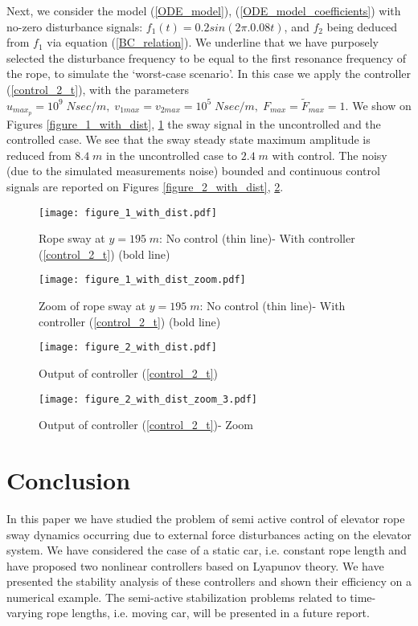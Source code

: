 \documentclass[letterpaper, 11 pt, conference]{ieeeconf}
\begin{document}
Next, we consider the model (\ref{ODE_model}),
(\ref{ODE_model_coefficients}) with no-zero disturbance signals:
$f_{1}(t)=0.2 sin(2\pi.0.08t)$, and $f_{2}$ being deduced from
$f_{1}$ via equation (\ref{BC_relation}). We underline that we
have purposely selected the disturbance frequency to be equal to
the first resonance frequency of the rope, to simulate the
`worst-case scenario'. In this case we apply the controller
(\ref{control_2_t}), with the parameters $u_{max_p}=10^9 \;N
sec/m,\;v_{1max}=v_{2max}=10^5\;N
sec/m,\;F_{max}=\tilde{F}_{max}=1$. We show on Figures
\ref{figure_1_with_dist}, \ref{figure_1_with_dist_zoom} the sway
signal in the uncontrolled and the controlled case. We see that
the sway steady state maximum amplitude is reduced from $8.4\;m$
in the uncontrolled case to $2.4\;m$ with control. The noisy
 (due to the simulated measurements noise) bounded and continuous control signals are reported on Figures
\ref{figure_2_with_dist}, \ref{figure_2_with_dist_zoom}.

\begin{figure}
\centering
\texttt{[image: figure\_1\_with\_dist.pdf]}\vspace{-3cm}
\caption{Rope sway at $y=195\;m$: No control (thin line)- With
controller (\ref{control_2_t}) (bold line)}
\label{figure_1_with_dist} \vspace{-3cm}
\texttt{[image: figure\_1\_with\_dist\_zoom.pdf]}\vspace{-3cm}
\caption{Zoom of rope sway at $y=195\;m$: No control (thin line)-
With controller (\ref{control_2_t}) (bold line)}
\label{figure_1_with_dist_zoom}
\end{figure}
\begin{figure}
\centering
\texttt{[image: figure\_2\_with\_dist.pdf]}\vspace{-3cm}
\caption{Output of controller (\ref{control_2_t})}
\label{figure_2_with_dist} \vspace{-3cm}
\texttt{[image: figure\_2\_with\_dist\_zoom\_3.pdf]}\vspace{-3cm}
 \caption{Output of controller (\ref{control_2_t})- Zoom}
 \label{figure_2_with_dist_zoom}
\end{figure}
\section{Conclusion}\label{section4}
In this paper we have studied the problem of semi active control
of elevator rope sway dynamics occurring due to external force
disturbances acting on the elevator system. We have considered the
case of a static car, i.e. constant rope length and have proposed
two nonlinear controllers based on Lyapunov theory. We have
presented the stability analysis of these controllers and shown
their efficiency on a numerical example. The semi-active
stabilization problems related to time-varying rope lengths, i.e.
moving car, will be presented in a future report.
\end{document}
